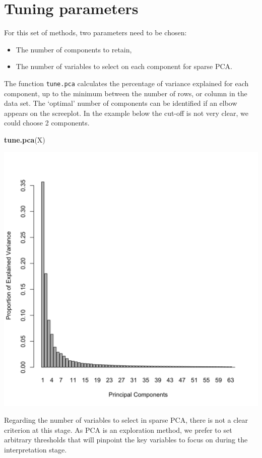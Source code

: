 \documentclass[]{book}
\newenvironment{Shaded}{\begin{snugshade}}{\end{snugshade}}
\newcommand{\KeywordTok}[1]{\textcolor[rgb]{0.13,0.29,0.53}{\textbf{#1}}}
\newcommand{\NormalTok}[1]{#1}
\providecommand{\tightlist}{%
  \setlength{\itemsep}{0pt}\setlength{\parskip}{0pt}}
\begin{document}
\hypertarget{tuning-parameters}{%
\section{Tuning parameters}\label{tuning-parameters}}

For this set of methods, two parameters need to be chosen:

\begin{itemize}
\tightlist
\item
  The number of components to retain,
\item
  The number of variables to select on each component for sparse PCA.
\end{itemize}

The function \texttt{tune.pca} calculates the percentage of variance explained for each component, up to the minimum between the number of rows, or column in the data set. The `optimal' number of components can be identified if an elbow appears on the screeplot. In the example below the cut-off is not very clear, we could choose 2 components.

\begin{Shaded}
\begin{Highlighting}[]
\KeywordTok{tune.pca}\NormalTok{(X)}
\end{Highlighting}
\end{Shaded}

\begin{center}\includegraphics[width=0.75\linewidth,]{Figures/03-tune-pca-1} \end{center}

Regarding the number of variables to select in sparse PCA, there is not a clear criterion at this stage. As PCA is an exploration method, we prefer to set arbitrary thresholds that will pinpoint the key variables to focus on during the interpretation stage.
\end{document}
